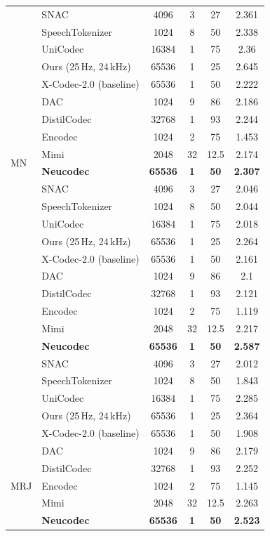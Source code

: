 \documentclass[preprint]{article}
\begin{document}
\begin{longtable}{llcccc}
  & SNAC & 4096 & 3 & 27 & 2.361 \\
  & SpeechTokenizer & 1024 & 8 & 50 & 2.338 \\
  & UniCodec & 16384 & 1 & 75 & 2.36 \\
  & Ours (25\,Hz, 24\,kHz) & 65536 & 1 & 25 & 2.645 \\
  & X-Codec-2.0 (baseline) & 65536 & 1 & 50 & 2.222 \\
\midrule
\multirow{8}{*}{MN}
  & DAC & 1024 & 9 & 86 & 2.186 \\
  & DistilCodec & 32768 & 1 & 93 & 2.244 \\
  & Encodec & 1024 & 2 & 75 & 1.453 \\
  & Mimi & 2048 & 32 & 12.5 & 2.174 \\
  & \textbf{Neucodec} & \textbf{65536} & \textbf{1} & \textbf{50} & \textbf{2.307} \\
  & SNAC & 4096 & 3 & 27 & 2.046 \\
  & SpeechTokenizer & 1024 & 8 & 50 & 2.044 \\
  & UniCodec & 16384 & 1 & 75 & 2.018 \\
  & Ours (25\,Hz, 24\,kHz) & 65536 & 1 & 25 & 2.264 \\
  & X-Codec-2.0 (baseline) & 65536 & 1 & 50 & 2.161 \\
\newpage
\multirow{8}{*}{MR}
  & DAC & 1024 & 9 & 86 & 2.1 \\
  & DistilCodec & 32768 & 1 & 93 & 2.121 \\
  & Encodec & 1024 & 2 & 75 & 1.119 \\
  & Mimi & 2048 & 32 & 12.5 & 2.217 \\
  & \textbf{Neucodec} & \textbf{65536} & \textbf{1} & \textbf{50} & \textbf{2.587} \\
  & SNAC & 4096 & 3 & 27 & 2.012 \\
  & SpeechTokenizer & 1024 & 8 & 50 & 1.843 \\
  & UniCodec & 16384 & 1 & 75 & 2.285 \\
  & Ours (25\,Hz, 24\,kHz) & 65536 & 1 & 25 & 2.364 \\
  & X-Codec-2.0 (baseline) & 65536 & 1 & 50 & 1.908 \\
\midrule
\multirow{8}{*}{MRJ}
  & DAC & 1024 & 9 & 86 & 2.179 \\
  & DistilCodec & 32768 & 1 & 93 & 2.252 \\
  & Encodec & 1024 & 2 & 75 & 1.145 \\
  & Mimi & 2048 & 32 & 12.5 & 2.263 \\
  & \textbf{Neucodec} & \textbf{65536} & \textbf{1} & \textbf{50} & \textbf{2.523} \\

\end{longtable}
\end{document}
